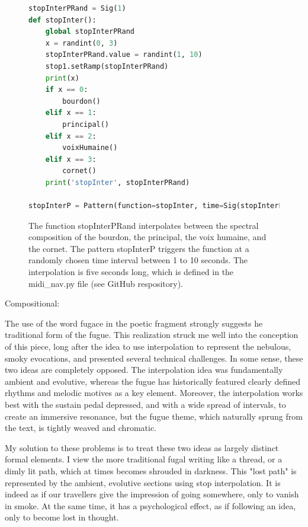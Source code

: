 \documentclass[12pt,twoside,maitrise]{dms_ks}
\theoremstyle{definition}
\begin{document}
\begin{figure}[H]
\begin{lstlisting}[language=Python]
stopInterPRand = Sig(1)
def stopInter():
    global stopInterPRand
    x = randint(0, 3)
    stopInterPRand.value = randint(1, 10)
    stop1.setRamp(stopInterPRand)
    print(x)
    if x == 0:
        bourdon()
    elif x == 1:
        principal()
    elif x == 2:
        voixHumaine()
    elif x == 3:
        cornet()
    print('stopInter', stopInterPRand)

stopInterP = Pattern(function=stopInter, time=Sig(stopInterPRand))
\end{lstlisting}
\caption{The function stopInterPRand interpolates between the spectral composition of the bourdon, the principal, the voix humaine, and the cornet.
The pattern stopInterP triggers the function at a randomly chosen time interval between 1 to 10 seconds.
The interpolation is five seconds long, which is defined in the midi\_nav.py file (see GitHub respository).}
\end{figure}

Compositional:

The use of the word fugace in the poetic fragment strongly suggests he traditional form of the fugue.
This realization struck me well into the conception of this piece, long after the idea to use interpolation to represent the nebulous, smoky evocations, and presented several technical challenges.
In some sense, these two ideas are completely opposed.
The interpolation idea was fundamentally ambient and evolutive, whereas the fugue has historically featured clearly defined rhythms and melodic motives as a key element.
Moreover, the interpolation works best with the sustain pedal depressed, and with a wide spread of intervals, to create an immersive resonance, but the fugue theme, which naturally sprung from the text, is tightly weaved and chromatic.

My solution to these problems is to treat these two ideas as largely distinct formal elements.
I view the more traditional fugal writing like a thread, or a dimly lit path, which at times becomes shrouded in darkness.
This "lost path" is represented by the ambient, evolutive sections using stop interpolation.
It is indeed as if our travellers give the impression of going somewhere, only to vanish in smoke.
At the same time, it has a psychological effect, as if following an idea, only to become lost in thought.
\end{document}
